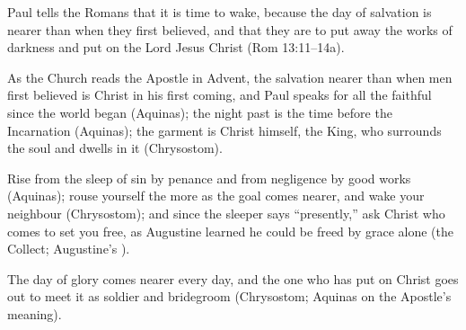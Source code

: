 \begin{fourSenses}
\item[Literal.] Paul tells the Romans that it is time to wake, because the
day of salvation is nearer than when they first believed, and that they are
to put away the works of darkness and put on the Lord Jesus Christ (Rom
13:11--14a).
\item[Allegorical.] As the Church reads the Apostle in Advent, the salvation
nearer than when men first believed is Christ in his first coming, and Paul
speaks for all the faithful since the world began (Aquinas); the night past
is the time before the Incarnation (Aquinas); the garment is Christ himself,
the King, who surrounds the soul and dwells in it (Chrysostom).
\item[Moral.] Rise from the sleep of sin by penance and from negligence by
good works (Aquinas); rouse yourself the more as the goal comes nearer, and
wake your neighbour (Chrysostom); and since the sleeper says ``presently,''
ask Christ who comes to set you free, as Augustine learned he could be freed
by grace alone (the Collect; Augustine's ).
\item[Anagogical.] The day of glory comes nearer every day, and the one who
has put on Christ goes out to meet it as soldier and bridegroom (Chrysostom;
Aquinas on the Apostle's meaning).
\end{fourSenses}
